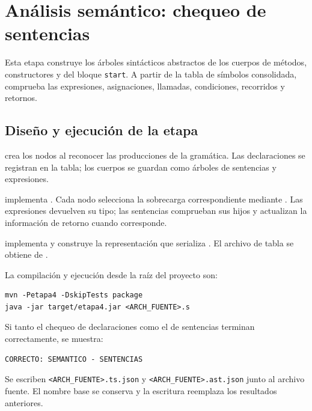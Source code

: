 \chapter{Análisis semántico: chequeo de sentencias}
\label{cap:semantico-sentencias}
\begingroup
\setlength{\emergencystretch}{4em}

Esta etapa construye los árboles sintácticos abstractos de los cuerpos
de métodos, constructores y del bloque \texttt{start}. A partir de la
tabla de símbolos consolidada, comprueba las expresiones, asignaciones,
llamadas, condiciones, recorridos y retornos.

\section{Diseño y ejecución de la etapa}
\label{sec:diseno-sentencias}

\begin{description}[style=nextline]
  \item[Reconocimiento y construcción]
   crea los nodos al reconocer las producciones
  de la gramática. Las declaraciones se registran en la tabla; los
  cuerpos se guardan como árboles de sentencias y expresiones.
  \item[Chequeo]
   implementa . Cada nodo
  selecciona la sobrecarga correspondiente mediante .
  Las expresiones devuelven su tipo; las sentencias comprueban sus hijos
  y actualizan la información de retorno cuando corresponde.
  \item[Exportación]
   implementa  y
  construye la representación que serializa .
  El archivo de tabla se obtiene de .
\end{description}


La compilación y ejecución desde la raíz del proyecto son:
\begin{verbatim}
mvn -Petapa4 -DskipTests package
java -jar target/etapa4.jar <ARCH_FUENTE>.s
\end{verbatim}
Si tanto el chequeo de declaraciones como el de sentencias terminan correctamente, se muestra:
\begin{verbatim}
CORRECTO: SEMANTICO - SENTENCIAS
\end{verbatim}
Se escriben \texttt{<ARCH\_FUENTE>.ts.json} y
\texttt{<ARCH\_FUENTE>.ast.json} junto al archivo fuente. El nombre
base se conserva y la escritura reemplaza los resultados anteriores.

